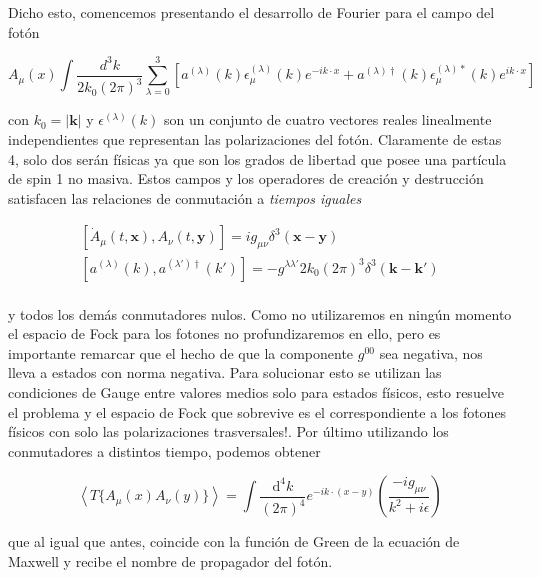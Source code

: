 \documentclass[tickz]{article}
\numberwithin{equation}{section}
\begin{document}
Dicho esto, comencemos presentando el desarrollo de Fourier para el campo del fotón

\begin{equation}
A_{\mu}(x) \int \frac{d^3k}{2k_0(2\pi)^3} \sum_{\lambda=0}^3 \left[a^{(\lambda)}(k)\epsilon_{\mu}^{(\lambda)}(k)e^{-ik\cdot x} + a^{(\lambda)\dagger}(k)\epsilon_{\mu}^{(\lambda)*}(k)e^{ik\cdot x} \right]
\end{equation}

con $ k_0 = | \mathbf{k} | $ y $ \epsilon^{(\lambda)}(k) $ son un conjunto de cuatro vectores reales linealmente independientes que representan las polarizaciones del fotón. Claramente de estas 4, solo dos serán físicas ya que son los grados de libertad que posee una partícula de spin 1 no masiva. Estos campos y los operadores de creación y destrucción satisfacen las relaciones de conmutación a \textit{tiempos iguales}

\begin{equation}
\begin{aligned}
\left[\dot{A}_{\mu}(t,\mathbf{x}),A_{\nu}(t,\mathbf{y})\right]=ig_{\mu \nu}\delta^3(\mathbf{x} - \mathbf{y})\\
\left[a^{(\lambda)}(k),a^{(\lambda')\dagger}(k')\right]=-g^{\lambda \lambda'}2k_0(2\pi)^3\delta^3(\mathbf{k} - \mathbf{k'})\\
\end{aligned}
\end{equation}

y todos los demás conmutadores nulos. Como no utilizaremos en ningún momento el espacio de Fock para los fotones no profundizaremos en ello, pero es importante remarcar que el hecho de que la componente $ g^{00} $ sea negativa, nos lleva a estados con norma negativa. Para solucionar esto se utilizan las condiciones de Gauge entre valores medios solo para estados físicos, esto resuelve el problema y el espacio de Fock que sobrevive es el correspondiente a los fotones físicos con solo las polarizaciones trasversales!. Por último utilizando los conmutadores a distintos tiempo, podemos obtener

\begin{equation}\label{prop_foton}
\left\langle T\{A_{\mu}(x)A_{\nu}(y)\} \right\rangle =\int\frac{\mathrm{d^4}k}{(2\pi)^{4}}e^{-ik\cdot(x-y)}\left(\frac{-ig_{\mu\nu}}{k^2 +i\epsilon}\right)
\end{equation}

que al igual que antes, coincide con la función de Green de la ecuación de Maxwell y recibe el nombre de propagador del fotón.\\
\end{document}
